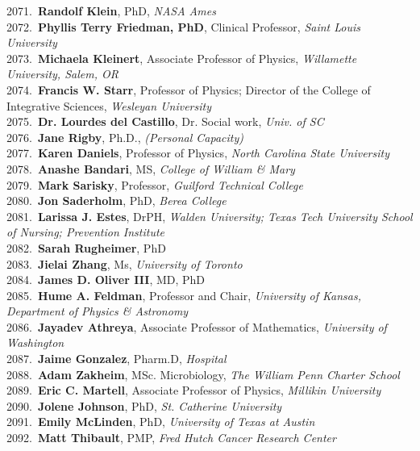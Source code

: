 2071.~{\bf Randolf Klein}, PhD, {\sl NASA Ames} \\
2072.~{\bf Phyllis Terry Friedman, PhD}, Clinical Professor, {\sl Saint Louis University} \\
2073.~{\bf Michaela Kleinert}, Associate Professor of Physics, {\sl Willamette University, Salem, OR} \\
2074.~{\bf Francis W. Starr}, Professor of Physics; Director of the College of Integrative Sciences, {\sl Wesleyan University} \\
2075.~{\bf Dr. Lourdes del Castillo}, Dr. Social work, {\sl Univ. of SC} \\
2076.~{\bf Jane Rigby}, Ph.D., {\sl (Personal Capacity)} \\
2077.~{\bf Karen Daniels}, Professor of Physics, {\sl North Carolina State University} \\
2078.~{\bf Anashe Bandari}, MS, {\sl College of William \& Mary} \\
2079.~{\bf Mark Sarisky}, Professor, {\sl Guilford Technical College} \\
2080.~{\bf Jon Saderholm}, PhD, {\sl Berea College} \\
2081.~{\bf Larissa J. Estes}, DrPH, {\sl Walden University; Texas Tech University School of Nursing; Prevention Institute } \\
2082.~{\bf Sarah Rugheimer}, PhD \\
2083.~{\bf Jielai Zhang}, Ms, {\sl University of Toronto} \\
2084.~{\bf James D. Oliver III}, MD, PhD \\
2085.~{\bf Hume A. Feldman}, Professor and Chair, {\sl University of Kansas, Department of Physics \& Astronomy} \\
2086.~{\bf Jayadev Athreya}, Associate Professor of Mathematics, {\sl University of Washington} \\
2087.~{\bf Jaime Gonzalez}, Pharm.D, {\sl Hospital} \\
2088.~{\bf Adam Zakheim}, MSc. Microbiology, {\sl The William Penn Charter School} \\
2089.~{\bf Eric C. Martell}, Associate Professor of Physics, {\sl Millikin University } \\
2090.~{\bf Jolene Johnson}, PhD, {\sl St. Catherine University} \\
2091.~{\bf Emily McLinden}, PhD, {\sl University of Texas at Austin } \\
2092.~{\bf Matt Thibault}, PMP, {\sl Fred Hutch Cancer Research Center} \\
